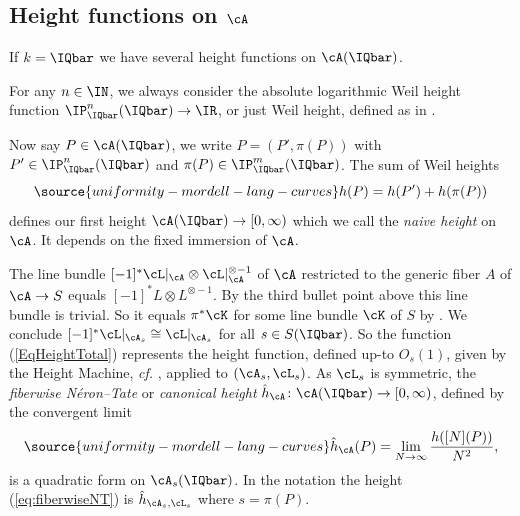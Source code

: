 \subsection{Height functions on $\cA$}\label{SubsectionHeight}
If $k=\IQbar$ we have several height functions on $\cA(\IQbar)$.

For any $n \in \IN$, we always consider the absolute logarithmic
Weil height function $\IP_{\IQbar}^n(\IQbar) \rightarrow \IR$, or just
Weil height, defined as in \cite[$\mathsection$1.5.1]{BG}.

Now say $P\in \cA(\IQbar)$, we write $P=(P',\pi(P))$ with
$P'\in \IP_{\IQbar}^n(\IQbar)$ and
$\pi(P)\in \IP_{\IQbar}^m(\IQbar)$. The sum of
Weil heights
\begin{equation}\label{EqHeightTotal}
\source{uniformity-mordell-lang-curves}
h(P) = h(P') + h(\pi(P))
\end{equation}
defines our first height $\cA(\IQbar)\rightarrow [0,\infty)$ which we
call the \textit{naive height} on $\cA$. It depends on the fixed
immersion of $\cA$.

The line bundle $[-1]^*\cL|_{\cA} \otimes\cL|_{\cA}^{\otimes -1}$ of
${\cA}$ restricted to the generic fiber $A$ of $\cA\rightarrow S$
equals $[-1]^*L \otimes L^{\otimes -1}$. By the third bullet point above this line
bundle is trivial. So it equals $\pi^*\cK$ for some line bundle $\cK$
of $S$ by \cite[Corollaire~21.4.13 (pp.~361 of EGA IV-4, in Errata et Addenda, liste~3)]{EGAIV}. We conclude
$[-1]^*\cL|_{\cA_s}\cong \cL|_{\cA_s}$ for all $s\in S(\IQbar)$. So
the function (\ref{EqHeightTotal}) represents the height function,
defined up-to $O_s(1)$, given by the Height
Machine, \textit{cf.} \cite[Theorem 2.3.8]{BG}, applied to
$(\cA_s,\cL_s)$. As $\cL_s$ is symmetric, the \textit{fiberwise
N\'eron--Tate} or \textit{canonical height} $\hat
h_{\cA} \colon \cA(\IQbar)\rightarrow [0,\infty)$, defined by the
convergent limit
\begin{equation}
\label{eq:fiberwiseNT}
\source{uniformity-mordell-lang-curves}
\hat h_{\cA}(P) = \lim_{N\rightarrow\infty} \frac{h([N](P))}{N^2},%
\end{equation}
is a quadratic form on $\cA_s(\IQbar)$. In the notation \cite[Chapter~9]{BG} the height
(\ref{eq:fiberwiseNT}) is $\hat h_{\cA_s,\cL_s}$ where $s=\pi(P)$.


